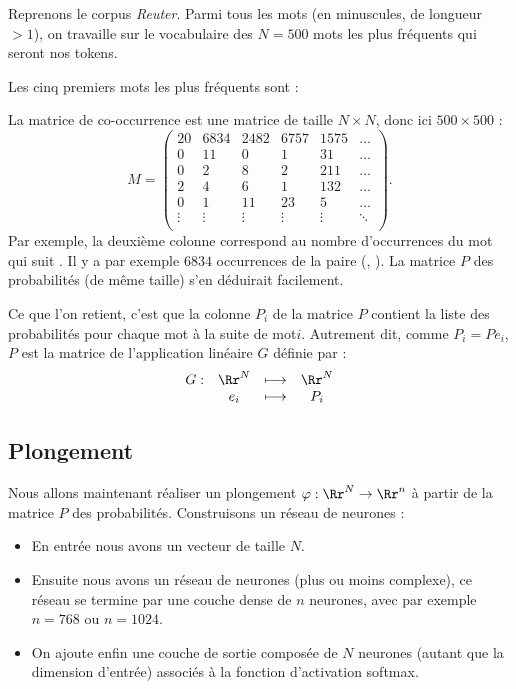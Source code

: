 \documentclass[11pt,class=report,crop=false]{standalone}
\begin{document}
\begin{exemple}
Reprenons le corpus \emph{Reuter}. Parmi tous les mots (en minuscules, de longueur $>1$), on travaille sur le vocabulaire  des $N=500$ mots les plus fréquents qui seront nos tokens.

Les cinq premiers mots les plus fréquents sont : 

La matrice de co-occurrence est une matrice de taille $N \times N$, donc ici $500 \times 500$ :
$$M = \begin{pmatrix}
 20 & 6834 & 2482 & 6757 & 1575 & \ldots \\
  0 &  11  &  0   & 1 &  31     & \ldots \\
  0 &   2  &  8   & 2 & 211     &\ldots \\
  2 &   4  &  6   & 1 & 132     &\ldots \\
  0 &   1  & 11   & 23 &   5    & \ldots \\
  \vdots & \vdots & \vdots & \vdots & \vdots & \ddots \\
\end{pmatrix}.$$
Par exemple, la deuxième colonne correspond au nombre d'occurrences du mot qui suit . 
Il y a par exemple $6834$ occurrences de la paire (, ).
La matrice $P$ des probabilités (de même taille) s'en déduirait facilement.
\end{exemple}

Ce que l'on retient, c'est que la colonne $P_i$ de la matrice $P$ contient la liste des probabilités pour chaque mot à la suite de mot$i$. Autrement dit, comme $P_i = P e_i$, $P$ est la matrice de l'application linéaire $G$ définie par :
$$
\begin{array}{rccc}
G : & \Rr^N & \longmapsto & \Rr^N \\
    & e_i   & \longmapsto & P_i
\end{array}
$$




\subsection{Plongement}


Nous allons maintenant réaliser un plongement $\varphi : \Rr^N \to \Rr^n$ à partir de la matrice $P$ des probabilités.
Construisons un réseau de neurones :
\begin{itemize}
	\item En entrée nous avons un vecteur de taille $N$.
	
	\item Ensuite nous avons un réseau de neurones (plus ou moins complexe), ce réseau se termine par une couche dense de $n$ neurones, avec par exemple $n=768$ ou $n=1024$. 
	
	\item On ajoute enfin une couche de sortie composée de $N$ neurones (autant que la dimension d'entrée) associés à la fonction d'activation  softmax.
\end{itemize}
\end{document}
